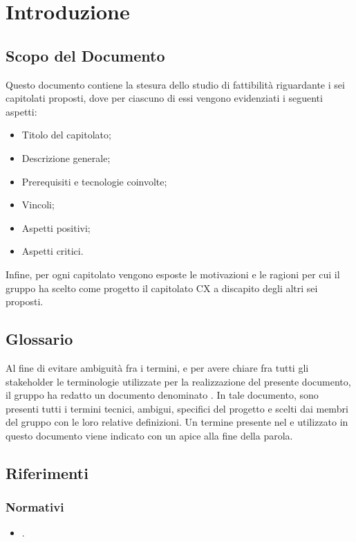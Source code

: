 \section{Introduzione}
\subsection{Scopo del Documento}
Questo documento contiene la stesura dello studio di fattibilità riguardante i sei capitolati proposti, dove per ciascuno di essi vengono evidenziati i seguenti aspetti:
\begin{itemize}
    \item Titolo del capitolato;
    \item Descrizione generale;
    \item Prerequisiti e tecnologie coinvolte;
    \item Vincoli;
    \item Aspetti positivi;
    \item Aspetti critici.
\end{itemize}
Infine, per ogni capitolato vengono esposte le motivazioni e le ragioni per cui il gruppo ha scelto come progetto il capitolato CX \NomeProgetto{} a discapito degli altri sei proposti.

\subsection{Glossario}
Al fine di evitare ambiguità fra i termini, e per avere chiare fra tutti gli stakeholder le terminologie utilizzate per la realizzazione del presente documento, il gruppo \Gruppo{} ha redatto un documento denominato .
In tale documento, sono presenti tutti i termini tecnici, ambigui, specifici del progetto e scelti dai membri del gruppo con le loro relative definizioni.
Un termine presente nel  e utilizzato in questo documento viene indicato con un apice  alla fine della parola.

\subsection{Riferimenti}

\subsubsection{Normativi}
\begin{itemize}
\item {}.
\end{itemize}

